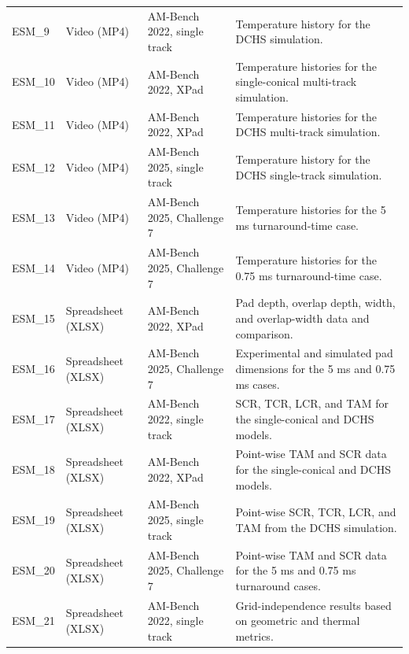 \documentclass[11pt]{article}
\begin{document}
\begin{longtable}{p{} p{} p{} p{}}
ESM\_9 &
Video (MP4) &
AM-Bench 2022, single track &
Temperature history for the DCHS simulation. \\

ESM\_10 &
Video (MP4) &
AM-Bench 2022, XPad &
Temperature histories for the single-conical multi-track simulation. \\

ESM\_11 &
Video (MP4) &
AM-Bench 2022, XPad &
Temperature histories for the DCHS multi-track simulation. \\

ESM\_12 &
Video (MP4) &
AM-Bench 2025, single track &
Temperature history for the DCHS single-track simulation. \\

ESM\_13 &
Video (MP4) &
AM-Bench 2025, Challenge 7 &
Temperature histories for the 5 ms turnaround-time case. \\

ESM\_14 &
Video (MP4) &
AM-Bench 2025, Challenge 7 &
Temperature histories for the 0.75 ms turnaround-time case. \\

\midrule

ESM\_15 &
Spreadsheet (XLSX) &
AM-Bench 2022, XPad &
Pad depth, overlap depth, width, and overlap-width data and comparison. \\

ESM\_16 &
Spreadsheet (XLSX) &
AM-Bench 2025, Challenge 7 &
Experimental and simulated pad dimensions for the 5 ms and 0.75 ms cases. \\

ESM\_17 &
Spreadsheet (XLSX) &
AM-Bench 2022, single track &
SCR, TCR, LCR, and TAM for the single-conical and DCHS models. \\

ESM\_18 &
Spreadsheet (XLSX) &
AM-Bench 2022, XPad &
Point-wise TAM and SCR data for the single-conical and DCHS models. \\

ESM\_19 &
Spreadsheet (XLSX) &
AM-Bench 2025, single track &
Point-wise SCR, TCR, LCR, and TAM from the DCHS simulation. \\

ESM\_20 &
Spreadsheet (XLSX) &
AM-Bench 2025, Challenge 7 &
Point-wise TAM and SCR data for the 5 ms and 0.75 ms turnaround cases. \\

ESM\_21 &
Spreadsheet (XLSX) &
AM-Bench 2022, single track &
Grid-independence results based on geometric and thermal metrics. \\


\end{longtable}
\end{document}
